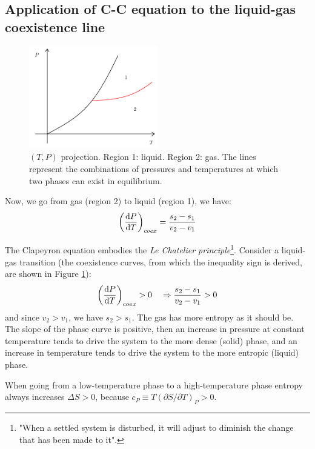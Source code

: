 \documentclass[../../Main/Main.tex]{subfiles}
\begin{document}
\subsection{Application of C-C equation to the liquid-gas coexistence line}
\begin{figure}[h!]
\centering
\includegraphics[width=0.5\textwidth]{./img/16__2.pdf}
\caption{\label{fig:3_16} \( (T,P) \) projection. Region 1: liquid. Region 2: gas. The lines represent the combinations of pressures and temperatures at which two phases can exist in equilibrium.}
\end{figure}

 Now, we go from gas (region 2) to liquid (region 1), we have:
\begin{equation*}
  \qty(\dv{P}{T} )_{coex} = \frac{s_2 - s_1}{v_2 - v_1}
  \label{eq:}
\end{equation*}

The Clapeyron equation embodies the \emph{Le Chatelier principle}\footnote{"When a settled system is disturbed, it will adjust to diminish the change that has been made to it".}.
 Consider a liquid-gas transition (the coexistence curves, from which the inequality sign is derived, are shown in Figure \ref{fig:3_16}):
\begin{equation*}
  \qty(\dv{P}{T} )_{coex} > 0 \quad \Rightarrow \frac{s_2 - s_1}{v_2 - v_1} > 0
\end{equation*}
and since \( v_2 > v_1 \), we have \( s_2 > s_1 \). The gas has more entropy as it should be.  The slope of the phase curve is positive, then an increase in pressure at constant temperature tends to drive the system to the more dense (solid) phase, and an increase in temperature tends to drive the system to the more entropic (liquid) phase.


When going from a low-temperature phase to a high-temperature phase entropy always increases \( \Delta S > 0 \), because \( c_P \equiv T (\partial{S}/\partial{T}  )_P > 0 \).
\end{document}
